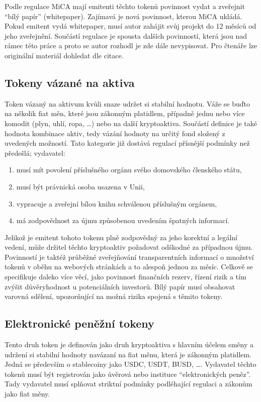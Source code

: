 Podle regulace MiCA mají emitenti těchto tokenů povinnost vydat a zveřejnit \enquote{bílý papír} (whitepaper). Zajímavá je nová povinnost,
kterou MiCA ukládá. Pokud emitent vydá whitepaper, musí autor zahájit svůj projekt do 12 měsíců od jeho zveřejnění. Součástí regulace je spousta dalších povinností, která jsou nad rámec
této práce a proto se autor rozhodl je zde dále nevypisovat. Pro čtenáře lze originální materiál dohledat dle citace.

\subsection{Tokeny vázané na aktiva}
Token vázaný na aktivum kvůli snaze udržet si stabilní hodnotu. Váže se buďto na několik fiat měn, které jsou zákonným platidlem, případně jednu nebo více komodit (plyn, uhlí, ropa, \ldots)
nebo na další kryptoaktiva. Součástí definice je také hodnota kombinace aktiv, tedy vázání hodnoty na určitý fond složený z uvedených možností. Tato kategorie již dostává regulací přísnější
podmínky než předešlá; vydavatel:
\begin{enumerate}
    \item musí mít povolení příslušného orgánu svého domovského členského státu,
    \item musí být právnická osoba usazena v Unii,
    \item vypracuje a zveřejní bílou knihu schválenou příslušným orgánem,
    \item má zodpovědnost za újmu způsobenou uvedením špatných informací.
\end{enumerate}
Jelikož je emitent tohoto tokenu plně zodpovědný za jeho korektní a legální vedení, může držitel těchto kryptoaktiv požadovat odškodné za případnou újmu. Povinností je taktéž
průběžné zveřejňování transparentních informací o množství tokenů v oběhu na webových stránkách a to alespoň jednou za měsíc. Celkově se specifikuje daleko více věcí, jako povinnost
finančních rezerv, řízení rizik a tím zvýšit důvěryhodnost u potenciálních investorů. Bílý papír musí obsahovat varovná sdělení, upozorňující na možná rizika spojená s těmito
tokeny.

\subsection{Elektronické peněžní tokeny}
Tento druh token je definován jako druh kryptoaktiva s hlavním účelem směny a udržení si stabilní hodnoty navázaní na fiat měnu, která je zákonným platidlem. Jedná se především o stablecoiny
jako USDC, USDT, BUSD, \ldots. Vydavatel těchto tokenů musí být registrován jako úvěrová nebo instituce \enquote{elektronických peněz}. Tady vydavatel musí splňovat striktní podmínky
podléhající regulaci a zákonům jako fiat měny.

\endinput